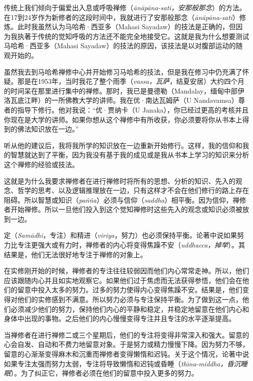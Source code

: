 传统上我们倾向于偏爱出入息或呼吸禅修（{\it \=an\=ap\=ana-sati，安那般那念}）的方法。在17到24岁作为新修者的这段时间中，我就进行了安那般那念（{\it \=an\=ap\=ana-sati}）修炼。此时我虽然认为马哈希·西亚多（Mahasi Sayadaw）的技法是正确的，但因为我\1执著于传统的觉知呼吸的方法还不能完全地接受它。这就是我为什么想要测试马哈希·西亚多（Mahasi Sayadaw）的技法的原因，该技法是以对腹部运动的随观开始的。

虽然我去到马哈希禅修中心并开始修习马哈希的技法，但是我在修习中仍充满了怀疑。那是在1953年，当时我花了整个雨季（{\it vassa，瓦萨}，结夏安居）大约四个月的时间呆在那里进行集中的禅修。那时，我已是曼德勒（Mandalay，缅甸中部伊洛瓦底江畔）的一所佛教大学的讲师。我在优·南达瓦姆萨（U Nandavamsa）尊者的指导下修行。他对我说：“优·贾纳卡（U Janaka），你已经过更高的考核并且你现在是大学的讲师。如果你想从这个禅修中有所收获，你必须要将你从书本上得到的佛法知识放在一边。”

听从他的建议后，我将我所学的知识放在一边重新开始修行。这样，我的信仰和我的智慧就达到了平衡，因为我没有基于我的成见或是我从书本上学习的知识来分析这个禅修的经验或技法。

这就是为什么我要求禅修者在进行禅修时将所有的思想、分析的知识、先入的观念、哲学的思考、以及逻辑推理放在一边，只有这样才不会在他们修行的路上存在阻碍。所以智慧或知识（{\it pa\~n\~na}）必须与信仰（{\it saddha}）相平衡。因为信仰，禅修者开始禅修。所以一旦他们投入到这个觉知禅修时这些先入的观念或知识必须被放到一边。

定（{\it Sam\=adhi}，专注）和精进（{\it viriya}，努力）也必须保持平衡。论著中说如果努力比专注更强大或有力时，禅修者的内心将变得焦躁不安（{\it uddhacca，掉举}）。其结果是，他们\1无法很好地专注于禅修的对象上。

在实修刚开始的时候，禅修者的专注往往较弱因而他们内心常常走神。所以，他们应该跟随内心并且如实地观察它。如果他们过于焦虑而无法获得参悟，他们会在他们的留意中投入太多的努力。过多的努力使得内心变得焦躁不安。结果是，他们变得对他们的实修感到不满意。所以努力必须与专注保持平衡。为了做到这一点，他们必须减少他们的努力，保持他们内心的平静和稳定，并稳定地留意在他们内心和身体中出现的事物。之后他们的内心慢慢变得专注并且专注的水平逐渐提高。

当禅修者在进行禅修二或三个星期后，他们的专注将变得非常深入和强大。留意的心会自发、自动和不费力地留意对象。于是努力或精力慢慢下降。因为努力不够，留意的心渐渐变得麻木和沉重而禅修者变得懒惰和迟钝。关于这个情况，论著中说如果专注太强而努力太弱，专注将导致懒惰和迟钝或昏睡（{\it th\=\i na-middha，昏沉睡眠}）。为了纠正它，禅修者必须在他们的留意中投入更多的努力。

